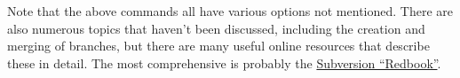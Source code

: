 Note that the above commands all have various options not mentioned.
There are also numerous topics that haven't been discussed, including
the creation and merging of branches, but there are many useful online
resources that describe these in detail. The most comprehensive
is probably the \href{http://svnbook.red-bean.com}{Subversion ``Redbook''}.



%
%
%
%
%
%
%
%
%
%
